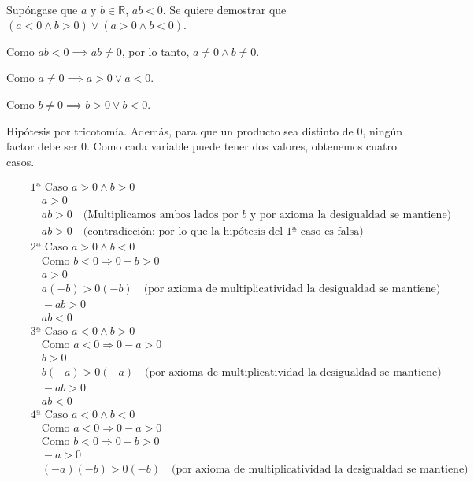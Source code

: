 \documentclass{article}
\begin{document}
\text{$\Rightarrow$}\\
Supóngase que $a$ y $b \in \mathbb{R}$, $ab < 0$. Se quiere demostrar que $(a < 0 \land b > 0) \lor (a > 0 \land b < 0)$.

Como $ab < 0 \implies ab \neq 0$, por lo tanto, $a \neq 0 \land b \neq 0$.

Como $a \neq 0 \implies a > 0 \lor a < 0$.

Como $b \neq 0 \implies b > 0 \lor b < 0$.

Hipótesis por tricotomía. Además, para que un producto sea distinto de 0, ningún factor debe ser 0.
Como cada variable puede tener dos valores, obtenemos cuatro casos.

\begin{align*}
&\quad \text{1ª Caso } a > 0 \land b > 0 \\
&\quad \quad a > 0 \\
&\quad \quad ab > 0 \quad \text{(Multiplicamos ambos lados por \(b\) y por axioma la desigualdad se mantiene)} \\
&\quad \quad ab > 0 \quad \text{(contradicción: por lo que la hipótesis del 1ª caso es falsa)}\\
&\quad \text{2ª Caso } a > 0 \land b < 0 \\
&\quad \quad \text{Como } b < 0 \Rightarrow 0 - b > 0 \\
&\quad \quad a > 0 \\
&\quad \quad a(-b) > 0(-b) \quad \text{(por axioma de multiplicatividad la desigualdad se mantiene)} \\
&\quad \quad -ab > 0 \\
&\quad \quad ab < 0 \\
&\quad \text{3ª Caso } a < 0 \land b > 0 \\
&\quad \quad \text{Como } a < 0 \Rightarrow 0 - a > 0 \\
&\quad \quad b > 0 \\
&\quad \quad b(-a) > 0(-a) \quad \text{(por axioma de multiplicatividad la desigualdad se mantiene)} \\
&\quad \quad -ab > 0 \\
&\quad \quad ab < 0 \\
&\quad \text{4ª Caso } a < 0 \land b < 0 \\
&\quad \quad \text{Como } a < 0 \Rightarrow 0 - a > 0 \\
&\quad \quad \text{Como } b < 0 \Rightarrow 0 - b > 0 \\
&\quad \quad -a > 0 \\
&\quad \quad (-a)(-b) > 0(-b) \quad \text{(por axioma de multiplicatividad la desigualdad se mantiene)} \\

\end{align*}
\end{document}
